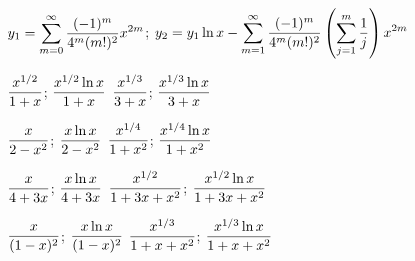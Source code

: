 $\displaystyle{y_{1}=\sum_{m=0}^{\infty}\frac{(-1)^{m}}{4^{m}(m!)^{2}}x^{2m}}$;\;
$\displaystyle{y_{2}=y_{1}\ln x-\sum_{m=1}^{\infty}\frac{(-1)^{m}}{4^{m}(m!)^{2}}\left(\sum_{j=1}^{m}\frac{1}{j}\right)x^{2m}}$

$\displaystyle\frac{x^{1/2}}{1+x}$;\;   $\displaystyle\frac{x^{1/2}\ln x}{1+x}$
$\displaystyle\frac{x^{1/3}}{3+x}$;\;   $\displaystyle\frac{x^{1/3}\ln x}{3+x}$

$\displaystyle\frac{x}{2-x^{2}}$;\;   $\displaystyle\frac{x\ln x}{2-x^{2}}$
$\displaystyle\frac{x^{1/4}}{1+x^{2}}$;\;   $\displaystyle\frac{x^{1/4}\ln x}{1+x^{2}}$

$\displaystyle\frac{x}{4+3x}$;\;   $\displaystyle\frac{x\ln x}{4+3x}$
$\displaystyle\frac{x^{1/2}}{1+3x+x^{2}}$;\;   $\displaystyle\frac{x^{1/2}\ln x}{1+3x+x^{2}}$

$\displaystyle\frac{x}{(1-x)^{2}}$;\;   $\displaystyle\frac{x\ln x}{(1-x)^{2}}$
$\displaystyle\frac{x^{1/3}}{1+x+x^{2}}$;\;   $\displaystyle\frac{x^{1/3}\ln x}{1+x+x^{2}}$

